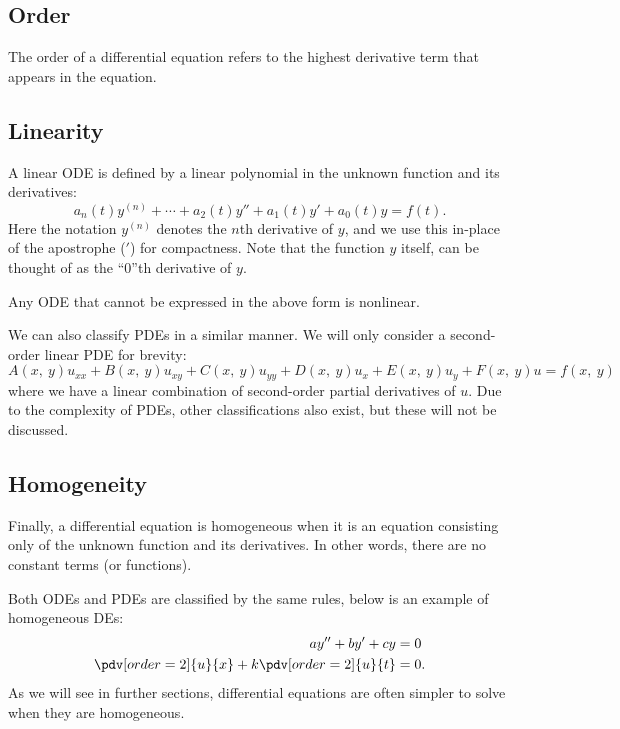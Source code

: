 \documentclass{article}
\begin{document}
\subsection{Order}
The order of a differential equation refers to the highest derivative term that appears in the equation.
\subsection{Linearity}
A linear ODE is defined by a linear polynomial in the unknown function and its derivatives:
\begin{equation*}
    a_n\left( t \right) y^{\left( n \right)} + \cdots + a_2\left( t \right) y'' + a_1\left( t \right) y' + a_0\left( t \right) y = f\left( t \right).
\end{equation*}
Here the notation \(y^{\left( n \right)}\) denotes the \(n\)th derivative of \(y\), and we use this in-place of the apostrophe (\('\)) for compactness.
Note that the function \(y\) itself, can be thought of as the ``0''th derivative of \(y\).

Any ODE that cannot be expressed in the above form is nonlinear.

We can also classify PDEs in a similar manner. We will only consider a second-order linear PDE for brevity:
\begin{equation*}
    A\left( x,\: y \right) u_{xx} + B\left( x,\: y \right) u_{xy} + C\left( x,\: y \right) u_{yy} + D\left( x,\: y \right) u_x + E\left( x,\: y \right) u_y + F\left( x,\: y \right) u = f\left( x,\: y \right)
\end{equation*}
where we have a linear combination of second-order partial derivatives of \(u\).
Due to the complexity of PDEs, other classifications also exist, but these will not be discussed.
\subsection{Homogeneity}
Finally, a differential equation is homogeneous when it is an equation consisting only of the unknown function and its derivatives. In other words,
there are no constant terms (or functions).

Both ODEs and PDEs are classified by the same rules, below is an example of homogeneous DEs:
\begin{align*}
    a y'' + b y' + c y                         & = 0  \\
    \pdv[order=2]{u}{x} + k\pdv[order=2]{u}{t} & = 0.
\end{align*}
As we will see in further sections, differential equations are often simpler to solve when they are homogeneous.
\end{document}
